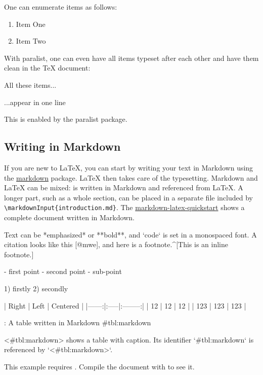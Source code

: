One can enumerate items as follows:

\begin{ltgexample}
\begin{enumerate}
  \item Item One
  \item Item Two
\end{enumerate}
\end{ltgexample}


With paralist, one can even have all items typeset after each other and have them clean in the TeX document:

\begin{ltgexample}
\begin{inparaenum}
  \item All these items...
  \item ...appear in one line
  \item This is enabled by the paralist package.
\end{inparaenum}
\end{ltgexample}

\subsection{Writing in Markdown}\label{sec:markdown}

\ifluatex
  If you are new to \LaTeX{}, you can start by writing your text in Markdown using the \href{https://ctan.org/pkg/markdown}{markdown} package.
  \LaTeX{} then takes care of the typesetting.
  Markdown and \LaTeX{} can be mixed:
   is written in Markdown and referenced from \LaTeX{}.
  A longer part, such as a whole section, can be placed in a separate file included by \verb|\markdownInput{introduction.md}|.
  The \href{https://github.com/latextemplates/markdown-latex-quickstart}{markdown-latex-quickstart} shows a complete document written in Markdown.

  \begin{ltgexample}
  \begin{markdown}
Text can be *emphasized* or **bold**, and `code` is set in a monospaced font.
A citation looks like this [@mwe], and here is a footnote.^[This is an inline footnote.]

- first point
- second point
  - sub-point

1) firstly
2) secondly

| Right | Left | Centered |
|------:|:-----|:--------:|
|    12 | 12   |    12    |
|   123 | 123  |   123    |

: A table written in Markdown {#tbl:markdown}

<#tbl:markdown> shows a table with caption.
Its identifier `{#tbl:markdown}` is referenced by `<#tbl:markdown>`.
\end{markdown}
  \end{ltgexample}
\else
  This example requires .
  Compile the document with  to see it.
\fi

